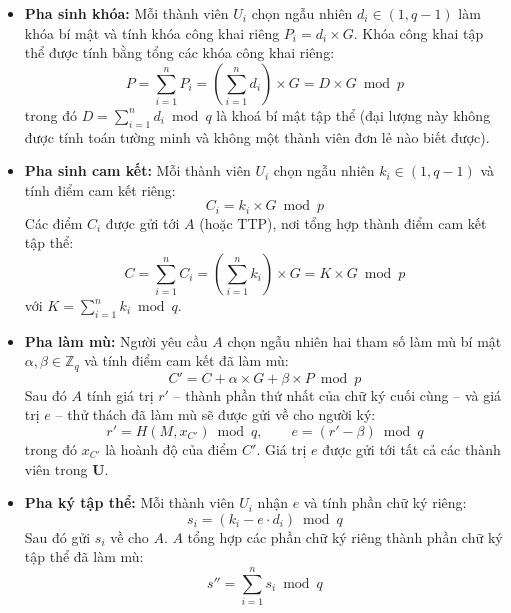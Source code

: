 \begin{itemize}
    \item \textbf{Pha sinh khóa:} Mỗi thành viên $U_i$ chọn ngẫu nhiên $d_i \in (1, q-1)$ làm khóa bí mật và tính khóa công khai riêng $P_i = d_i \times G$. Khóa công khai tập thể được tính bằng tổng các khóa công khai riêng:
    \begin{equation}
        P = \sum_{i=1}^{n} P_i = \left( \sum_{i=1}^{n} d_i \right) \times G = D \times G \bmod p
        \label{eq:bms-pubkey}
    \end{equation}
    trong đó $D = \sum_{i=1}^{n} d_i \bmod q$ là khoá bí mật tập thể (đại lượng này không được tính toán tường minh và không một thành viên đơn lẻ nào biết được).

    \item \textbf{Pha sinh cam kết:} Mỗi thành viên $U_i$ chọn ngẫu nhiên $k_i \in (1, q-1)$ và tính điểm cam kết riêng:
    \begin{equation}
        C_i = k_i \times G \bmod p
        \label{eq:bms-commit-i}
    \end{equation}
    Các điểm $C_i$ được gửi tới $A$ (hoặc TTP), nơi tổng hợp thành điểm cam kết tập thể:
    \begin{equation}
        C = \sum_{i=1}^{n} C_i = \left( \sum_{i=1}^{n} k_i \right) \times G = K \times G \bmod p
        \label{eq:bms-commit}
    \end{equation}
    với $K = \sum_{i=1}^{n} k_i \bmod q$.

    \item \textbf{Pha làm mù:} Người yêu cầu $A$ chọn ngẫu nhiên hai tham số làm mù bí mật $\alpha, \beta \in \mathbb{Z}_q$ và tính điểm cam kết đã làm mù:
    \begin{equation}
        C' = C + \alpha \times G + \beta \times P \bmod p
        \label{eq:bms-blind-c}
    \end{equation}
    Sau đó $A$ tính giá trị $r'$ -- thành phần thứ nhất của chữ ký cuối cùng -- và giá trị $e$ -- thử thách đã làm mù sẽ được gửi về cho người ký:
    \begin{equation}
        r' = H(M, x_{C'}) \bmod q, \qquad e = (r' - \beta) \bmod q
        \label{eq:bms-blind-challenge}
    \end{equation}
    trong đó $x_{C'}$ là hoành độ của điểm $C'$. Giá trị $e$ được gửi tới tất cả các thành viên trong $\mathbf{U}$.

    \item \textbf{Pha ký tập thể:} Mỗi thành viên $U_i$ nhận $e$ và tính phần chữ ký riêng:
    \begin{equation}
        s_i = (k_i - e \cdot d_i) \bmod q
        \label{eq:bms-sign-i}
    \end{equation}
    Sau đó gửi $s_i$ về cho $A$. $A$ tổng hợp các phần chữ ký riêng thành phần chữ ký tập thể đã làm mù:
    \begin{equation}
        s'' = \sum_{i=1}^{n} s_i \bmod q
        \label{eq:bms-sign-aggregate}
    \end{equation}


\end{itemize}

